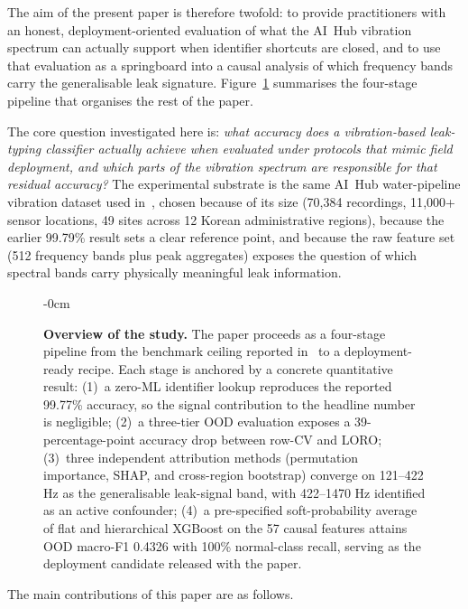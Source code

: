 \documentclass[sensors,article,submit,pdftex,oneauthor]{Definitions/mdpi}
\begin{document}
The aim of the present paper is therefore twofold: to provide
practitioners with an honest, deployment-oriented evaluation of
what the AI~Hub vibration spectrum can actually support when
identifier shortcuts are closed, and to use that evaluation as a
springboard into a causal analysis of which frequency bands
carry the generalisable leak signature. Figure~\ref{fig:overview}
summarises the four-stage pipeline that organises the rest of
the paper.

The core question investigated here is:
\emph{what accuracy does a vibration-based leak-typing
classifier actually achieve when evaluated under protocols that
mimic field deployment, and which parts of the vibration
spectrum are responsible for that residual accuracy?} The
experimental substrate is the same AI~Hub water-pipeline
vibration dataset used in~\cite{lee2023leak}, chosen because of
its size (70{,}384 recordings, 11{,}000+ sensor locations, 49
sites across 12 Korean administrative regions), because the
earlier 99.79\% result sets a clear reference point, and
because the raw feature set (512 frequency bands plus peak
aggregates) exposes the question of which spectral bands
carry physically meaningful leak information.

\begin{figure}[H]
\begin{adjustwidth}{-\extralength}{0cm}
\centering
\resizebox{\fulllength}{!}{}
\caption{\textbf{Overview of the study.} The paper proceeds as
a four-stage pipeline from the benchmark ceiling reported
in~\cite{lee2023leak} to a deployment-ready recipe. Each stage
is anchored by a concrete quantitative result: (1)~a zero-ML
identifier lookup reproduces the reported 99.77\% accuracy, so
the signal contribution to the headline number is negligible;
(2)~a three-tier OOD evaluation exposes a 39-percentage-point
accuracy drop between row-CV and LORO; (3)~three independent
attribution methods (permutation importance, SHAP, and
cross-region bootstrap) converge on 121--422 Hz as the
generalisable leak-signal band, with 422--1470 Hz identified
as an active confounder; (4)~a pre-specified soft-probability
average of flat and hierarchical XGBoost on the 57 causal features
attains OOD macro-F1 0.4326 with 100\% normal-class recall,
serving as the deployment candidate released with the
paper.\label{fig:overview}}
\end{adjustwidth}
\end{figure}

The main contributions of this paper are as follows.
\end{document}
